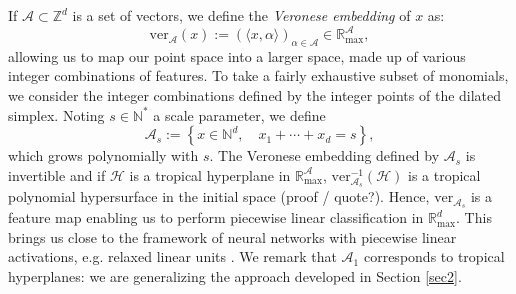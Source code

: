 \documentclass[oneside,english,a4paper]{amsart}
\numberwithin{equation}{section}
\numberwithin{figure}{section}
\theoremstyle{plain}
\theoremstyle{definition}
\theoremstyle{plain}
\theoremstyle{remark}
\theoremstyle{plain}
\theoremstyle{definition}
\theoremstyle{definition}
\begin{document}
If $\mathcal{A}\subset\mathbb{Z}^{d}$ is a set of vectors, we define
the \emph{Veronese embedding} of $x$ as:
\[
\text{ver}_{\mathcal{A}}(x):=\left(\langle x,\alpha\rangle\right)_{\alpha\in\mathcal{A}}\in\mathbb{R}_{\max}^{\mathcal{A}},
\]
allowing us to map our point space into a larger space, made up of
various integer combinations of features. To take a fairly exhaustive
subset of monomials, we consider the integer combinations defined
by the integer points of the dilated simplex. Noting $s\in\mathbb{N}^{*}$
a scale parameter, we define
\[
\mathcal{A}_{s}:=\left\{x\in\mathbb{N}^{d},\quad x_{1}+\cdots+x_{d}=s\right\},
\]
which grows polynomially with $s$. The Veronese embedding defined
by $\mathcal{A}_{s}$ is invertible and if $\mathcal{H}$ is a tropical
hyperplane in $\mathbb{R}_{\max}^{\mathcal{A}}$, $\text{ver}_{\mathcal{A}_{s}}^{-1}(\mathcal{H})$
is a tropical polynomial hypersurface in the initial space (proof
/ quote?). Hence, $\text{ver}_{\mathcal{A}_{s}}$ is a feature map
enabling us to perform piecewise linear classification in $\mathbb{R}_{\max}^{d}$. This brings us close to the framework of neural networks with piecewise linear activations, e.g. relaxed linear units \cite{zhang2018tropical}. We remark that $\mathcal{A}_1$ corresponds to tropical hyperplanes: we are generalizing the approach developed in Section \ref{sec2}.
\end{document}
